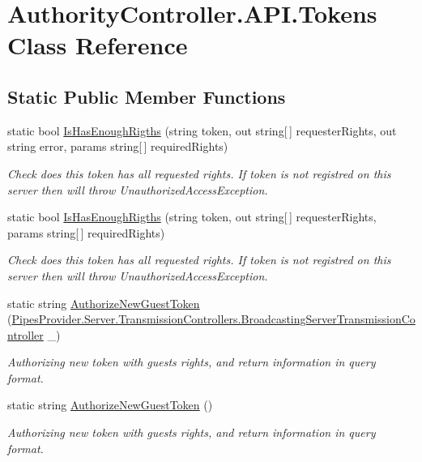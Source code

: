 \hypertarget{class_authority_controller_1_1_a_p_i_1_1_tokens}{}\section{Authority\+Controller.\+A\+P\+I.\+Tokens Class Reference}
\label{class_authority_controller_1_1_a_p_i_1_1_tokens}
\subsection*{Static Public Member Functions}
\begin{DoxyCompactItemize}
\item 
static bool \mbox{\hyperlink{class_authority_controller_1_1_a_p_i_1_1_tokens_a3077a786044bdd530ad50dbd615f8beb}{Is\+Has\+Enough\+Rigths}} (string token, out string\mbox{[}$\,$\mbox{]} requester\+Rights, out string error, params string\mbox{[}$\,$\mbox{]} required\+Rights)
\begin{DoxyCompactList}\small\item\em Check does this token has all requested rights. If token is not registred on this server then will throw Unauthorized\+Access\+Exception. \end{DoxyCompactList}\item 
static bool \mbox{\hyperlink{class_authority_controller_1_1_a_p_i_1_1_tokens_ab1d580a971a86c8e5b3c7c189aa65381}{Is\+Has\+Enough\+Rigths}} (string token, out string\mbox{[}$\,$\mbox{]} requester\+Rights, params string\mbox{[}$\,$\mbox{]} required\+Rights)
\begin{DoxyCompactList}\small\item\em Check does this token has all requested rights. If token is not registred on this server then will throw Unauthorized\+Access\+Exception. \end{DoxyCompactList}\item 
static string \mbox{\hyperlink{class_authority_controller_1_1_a_p_i_1_1_tokens_a8b153378b97af2634e8dab9ff1fa48a5}{Authorize\+New\+Guest\+Token}} (\mbox{\hyperlink{class_pipes_provider_1_1_server_1_1_transmission_controllers_1_1_broadcasting_server_transmission_controller}{Pipes\+Provider.\+Server.\+Transmission\+Controllers.\+Broadcasting\+Server\+Transmission\+Controller}} \+\_\+)
\begin{DoxyCompactList}\small\item\em Authorizing new token with guest\textquotesingle{}s rights, and return information in query format. \end{DoxyCompactList}\item 
static string \mbox{\hyperlink{class_authority_controller_1_1_a_p_i_1_1_tokens_a0ba1c2d69ffbc73d78b7b16735f7fb5a}{Authorize\+New\+Guest\+Token}} ()
\begin{DoxyCompactList}\small\item\em Authorizing new token with guest\textquotesingle{}s rights, and return information in query format. \end{DoxyCompactList}\end{DoxyCompactItemize}


